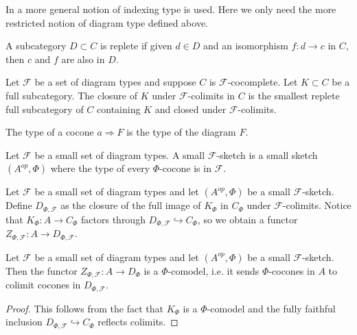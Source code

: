 \begin{remark}
 In \cite{kelly/basic-concepts-enriched} a more general notion of indexing type is used. Here we only need the more restricted notion of diagram type defined above.\end{remark}

\begin{definition}

A subcategory $D\subset C$ is replete if given $d\in D$ and an isomorphism $f:d\to c$ in $C$, then $c$ and $f$ are also in $D$.\end{definition}


\begin{definition}
Let $\mathcal{F}$ be a set of diagram types and suppose $C$ is $\mathcal{F}$-cocomplete. Let $K\subset C$ be a full subcategory. The closure of $K$ under $\mathcal{F}$-colimits in $C$ is the smallest replete full subcategory of $C$ containing $K$ and closed under $\mathcal{F}$-colimits. \end{definition}

\begin{definition}
 The type of a cocone $a\Rightarrow F$ is the type of the diagram $F$.\end{definition}

\begin{definition}
Let $\mathcal{F}$ be a small set of diagram types. A small $\mathcal{F}$-sketch is a small sketch $(A^{op},\Phi)$ where the type of every $\Phi$-cocone is in $\mathcal{F}$.\end{definition}


\begin{definition}

Let $\mathcal{F}$ be a small set of diagram types and let $(A^{op},\Phi)$ be a small $\mathcal{F}$-sketch. Define $D_{\Phi,\mathcal{F}}$ as the closure of the full image of $K_{\Phi}$ in $C_{\Phi}$ under $\mathcal{F}$-colimits. Notice that $K_{\Phi}:A\to C_{\Phi}$ factors through $D_{\Phi,\mathcal{F}}\hookrightarrow C_{\Phi}$, so we obtain a functor $Z_{\Phi,\mathcal{F}}:A\to D_{\Phi,\mathcal{F}}$.\end{definition}

\begin{lemma}
Let $\mathcal{F}$ be a small set of diagram types and let $(A^{op},\Phi)$ be a small $\mathcal{F}$-sketch. Then the functor $Z_{\Phi,\mathcal{F}}:A\to D_{\Phi}$ is a $\Phi$-comodel, i.e. it sends $\Phi$-cocones in $A$ to colimit cocones in $D_{\Phi,\mathcal{F}}$.
\end{lemma}
\begin{proof}
This follows from the fact that $K_{\Phi}$ is a $\Phi$-comodel and the fully faithful inclusion $D_{\Phi,\mathcal{F}}\hookrightarrow C_{\Phi}$ reflects colimits.\end{proof}

